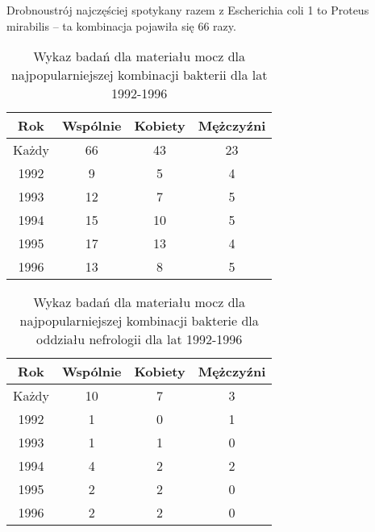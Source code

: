 \documentclass[a4paper,11pt]{article}
\begin{document}
Drobnoustrój najczęściej spotykany razem z Escherichia coli 1 to Proteus mirabilis – ta kombinacja pojawiła się 66 razy.



\begin{table}[H]
  \begin{center}
  \caption{Wykaz badań dla materiału mocz dla najpopularniejszej kombinacji bakterii dla lat 1992-1996}
  \begin{tabular}{|c|c|c|c|}
    \hline Rok &Wspólnie & Kobiety & Mężczyźni \\ \hline
    Każdy& 66& 43& 23 \\ \hline 
    1992& 9& 5& 4 \\ \hline
    1993& 12& 7& 5 \\ \hline
    1994& 15& 10& 5 \\ \hline
    1995& 17& 13& 4 \\ \hline
    1996& 13& 8& 5 \\ \hline
    
  \end{tabular}
\end{center}
\end{table}

\begin{table}[H]
  \begin{center}
  \caption{Wykaz badań dla materiału mocz dla najpopularniejszej kombinacji bakterie dla oddziału nefrologii dla lat 1992-1996}
  \begin{tabular}{|c|c|c|c|}
    \hline Rok &Wspólnie & Kobiety & Mężczyźni \\ \hline
Każdy& 10& 7& 3 \\ \hline 
1992& 1& 0& 1 \\ \hline
1993& 1& 1& 0 \\ \hline
1994& 4& 2& 2 \\ \hline
1995& 2& 2& 0 \\ \hline
1996& 2& 2& 0 \\ \hline
  \end{tabular}
\end{center}
\end{table}
\end{document}
